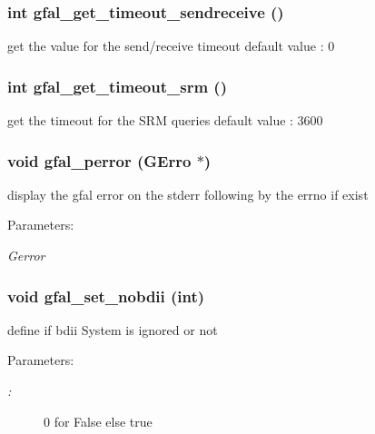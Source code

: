 \subsubsection{\setlength{\rightskip}{0pt plus 5cm}int gfal\_\-get\_\-timeout\_\-sendreceive ()}\label{group__common__group_g198564ca7617a8f3dec7c6b925b2c760}


get the value for the send/receive timeout default value : 0 
\subsubsection{\setlength{\rightskip}{0pt plus 5cm}int gfal\_\-get\_\-timeout\_\-srm ()}\label{group__common__group_g31f524748949fca765e6fb8aa20ef41c}


get the timeout for the SRM queries default value : 3600 
\subsubsection{\setlength{\rightskip}{0pt plus 5cm}void gfal\_\-perror (GErro $\ast$)}\label{group__common__group_g415856aac38775e6945702a058863a22}


display the gfal error on the stderr following by the errno if exist 

\begin{Desc}
\item[Parameters:]
\begin{description}
\item[{\em Gerror}]\end{description}
\end{Desc}
\subsubsection{\setlength{\rightskip}{0pt plus 5cm}void gfal\_\-set\_\-nobdii (int)}\label{group__common__group_g267920b468d7578c10aa25469f8cadf7}


define if bdii System is ignored or not 

\begin{Desc}
\item[Parameters:]
\begin{description}
\item[{\em :}]0 for False else true \end{description}
\end{Desc}
